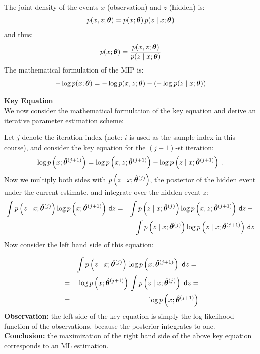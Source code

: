   The joint density of the events $x$ (observation) and $z$ (hidden) is:
  \begin{displaymath}
    p(x,z; \bm{\theta}) = p(x; \bm{\theta})\, p(z \mid x; \bm{\theta})
  \end{displaymath}
%
  and thus:
  \begin{displaymath}
    p(x; \bm{\theta})= \frac{p(x, z; \bm{\theta})}{p(z\mid x; \bm{\theta})}
  \end{displaymath}
    The mathematical formulation of the MIP is:
  \begin{displaymath}
    -\log p(x; \bm{\theta}) = -\log p(x, z; \bm{\theta}) -(-\log p(z\mid x; \bm{\theta}))
  \end{displaymath}
  
  \textbf{Key Equation}\\
  We now consider the mathematical formulation of the key equation and derive an iterative parameter estimation scheme:

  Let $j$ denote the iteration index (note: $i$ is used as the sample index in this course), and consider the key equation for the $(j+1)$-st iteration:
     {\small
       \begin{displaymath}
         \log p\left(x    ; \hat{\bm{\theta}}^{(j+1)} \right) =
         \log p\left(x, z ; \hat{\bm{\theta}}^{(j+1)} \right) -
         \log p\left(z\mid x  ; \hat{\bm{\theta}}^{(j+1)} \right)~.
       \end{displaymath}
     }
  Now we multiply both sides with $p\left( z\mid x ; \hat{\bm{\theta}}^{(j)} \right)$, the posterior of the hidden event under the current estimate, and integrate over the hidden event $z$:
     \footnotesize
     \begin{eqnarray*}
             \int p\left(z\mid x ; \hat{\bm{\theta}}^{(j)} \right) \log p\left( x ;   \hat{\bm{\theta}}^{(j+1)} \right)\, \mathsf{d}z
         &=& \int p\left(z\mid x ; \hat{\bm{\theta}}^{(j)} \right) \log p\left(x, z ; \hat{\bm{\theta}}^{(j+1)} \right)\, \mathsf{d}z -{} \\
         & & \int p\left(z\mid x ; \hat{\bm{\theta}}^{(j)} \right) \log p\left(z\mid x  ; \hat{\bm{\theta}}^{(j+1)} \right)\, \mathsf{d}z
     \end{eqnarray*}
 \normalsize
 Now consider the left hand side of this equation:
  
  \begin{eqnarray*}
          & & \int p\left(z\mid x ; \hat{\bm{\theta}}^{(j)}   \right) \, \log p\left( x ; \hat{\bm{\theta}}^{(j+1)} \right)\ \mathsf{d}z ={} \\  
          &=& \log p\left(x   ; \hat{\bm{\theta}}^{(j+1)} \right) \, \int p\left( z\mid x ; \hat{\bm{\theta}}^{(j)} \right)\ \mathsf{d}z = \\  
          &=& \log p\left(x   ; \hat{\bm{\theta}}^{(j+1)} \right)
  \end{eqnarray*}
  \textbf{Observation:} the left side of the key equation is simply the log-likelihood function of the observations, because the posterior integrates to one. \textbf{Conclusion:} the maximization of the right hand side of the above key equation corresponds to an ML estimation.
     
